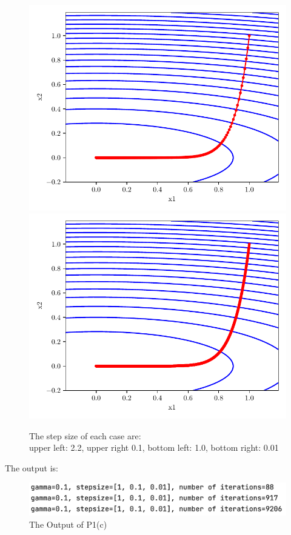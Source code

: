 \documentclass{article}
\begin{document}
\begin{enumerate}[(a).]
\begin{figure}[h]
\begin{minipage}[b]{0.23\linewidth}
			\includegraphics[width=1\linewidth]{gd_traces_gamma0.1_ss0.1.pdf}\vspace{4pt}
			\includegraphics[width=1\linewidth]{gd_traces_gamma0.1_ss0.01.pdf}
		\end{minipage}
		\caption{The step size of each case are:\\
		upper left: 2.2, upper right 0.1, bottom left: 1.0, bottom right: 0.01}
		\end{figure}

		The output is:
		\begin{figure}[h]
			\centering
			\includegraphics[width=0.7\linewidth]{p1c.png}
			\caption{The Output of P1(c)}
		\end{figure}


\end{enumerate}
\end{document}
